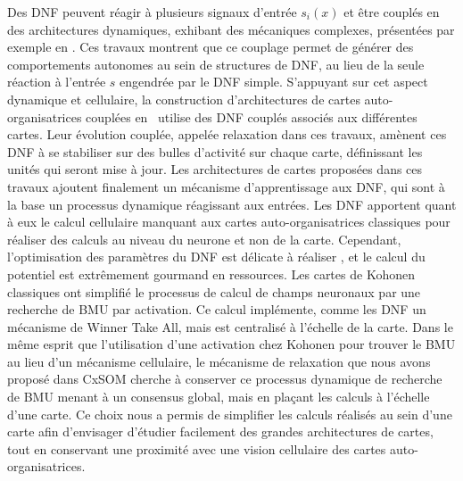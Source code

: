 \documentclass[../main]{subfiles}
\begin{document}
Des DNF peuvent réagir à plusieurs signaux d'entrée $s_i(x)$ et être couplés en des architectures dynamiques, exhibant des mécaniques complexes, présentées par exemple en \cite{Fix2011ADN, Sandamirskaya2014DynamicNF}.
Ces travaux montrent que ce couplage permet de générer des comportements autonomes au sein de structures de DNF, au lieu de la seule réaction à l'entrée $s$ engendrée par le DNF simple.
S'appuyant sur cet aspect dynamique et cellulaire, la construction d'architectures de cartes auto-organisatrices couplées en~\cite{khouzam_neural_2014,menard05} utilise des DNF couplés associés aux différentes cartes. Leur évolution couplée, appelée relaxation dans ces travaux, amènent ces DNF à se stabiliser sur des bulles d'activité sur chaque carte, définissant les unités qui seront mise à jour.
Les architectures de cartes proposées dans ces travaux ajoutent finalement un mécanisme d'apprentissage aux DNF, qui sont à la base un processus dynamique réagissant aux entrées.
Les DNF apportent quant à eux le calcul cellulaire manquant aux cartes auto-organisatrices classiques pour réaliser des calculs au niveau du neurone et non de la carte.
Cependant, l'optimisation des paramètres du DNF est délicate à réaliser \cite{fix:hal-00869726}, et le calcul du potentiel est extrêmement gourmand en ressources.
Les cartes de Kohonen classiques ont simplifié le processus de calcul de champs neuronaux par une recherche de BMU par activation. Ce calcul implémente, comme les DNF un mécanisme de Winner Take All, mais est centralisé à l'échelle de la carte.
Dans le même esprit que l'utilisation d'une activation chez Kohonen pour trouver le BMU au lieu d'un mécanisme cellulaire, le mécanisme de relaxation que nous avons proposé dans CxSOM cherche à conserver ce processus dynamique de recherche de BMU menant à un consensus global, mais en plaçant les calculs à l'échelle d'une carte. 
Ce choix nous a permis de simplifier les calculs réalisés au sein d'une carte afin d'envisager d'étudier facilement des grandes architectures de cartes, tout en conservant une proximité avec une vision cellulaire des cartes auto-organisatrices.
\end{document}
